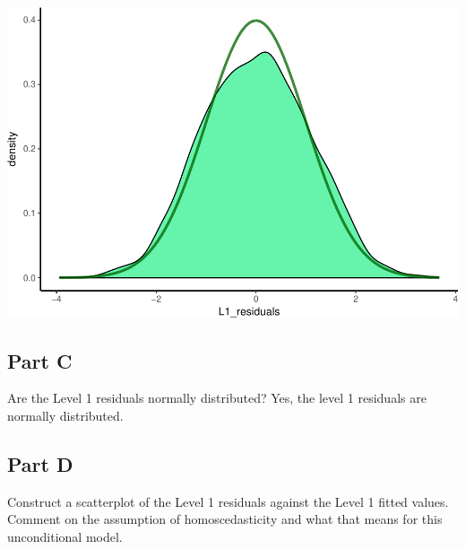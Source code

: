 \documentclass[]{article}
\newenvironment{Shaded}{\begin{snugshade}}{\end{snugshade}}
\newcommand{\KeywordTok}[1]{\textcolor[rgb]{0.13,0.29,0.53}{\textbf{#1}}}
\newcommand{\DataTypeTok}[1]{\textcolor[rgb]{0.13,0.29,0.53}{#1}}
\newcommand{\StringTok}[1]{\textcolor[rgb]{0.31,0.60,0.02}{#1}}
\newcommand{\OperatorTok}[1]{\textcolor[rgb]{0.81,0.36,0.00}{\textbf{#1}}}
\newcommand{\NormalTok}[1]{#1}
\begin{document}
\includegraphics{Beck_HW_5_files/figure-latex/unnamed-chunk-4-1.pdf}

\subsection{Part C}\label{part-c}

Are the Level 1 residuals normally distributed? Yes, the level 1
residuals are normally distributed.

\subsection{Part D}\label{part-d}

Construct a scatterplot of the Level 1 residuals against the Level 1
fitted values. Comment on the assumption of homoscedasticity and what
that means for this unconditional model.

\begin{Shaded}
\end{Shaded}
\end{document}
